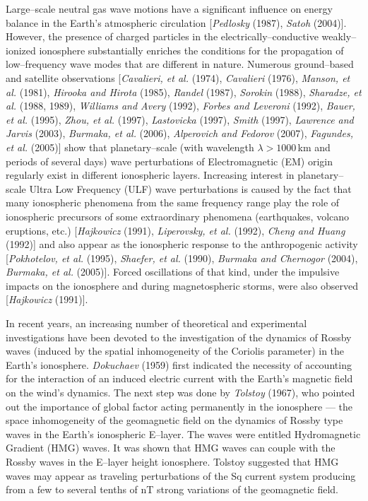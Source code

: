 \documentclass[a4paper,openany,12pt]{book}
\begin{document}
Large--scale neutral gas wave motions have a significant influence on energy balance in the Earth's atmospheric circulation [\emph{Pedlosky} (1987), \emph{Satoh} (2004)]. However, the presence of charged particles in the electrically--conductive weakly--ionized ionosphere substantially enriches the conditions for the propagation of low--frequency wave modes that are different in nature. Numerous ground--based and satellite observations [\emph{Cavalieri, et al.} (1974), \emph{Cavalieri} (1976), \emph{Manson, et al.} (1981), \emph{Hirooka and Hirota} (1985), \emph{Randel} (1987), \emph{Sorokin} (1988), \emph{Sharadze, et al.} (1988, 1989), \emph{Williams and Avery} (1992), \emph{Forbes and Leveroni} (1992), \emph{Bauer, et al.} (1995), \emph{Zhou, et al.} (1997), \emph{Lastovicka} (1997), \emph{Smith} (1997), \emph{Lawrence and Jarvis} (2003), \emph{Burmaka, et al.} (2006), \emph{Alperovich and Fedorov} (2007), \emph{Fagundes, et al.} (2005)] show that planetary--scale (with wavelength $\lambda>1000\,$km and periods of several days) wave perturbations of Electromagnetic (EM) origin regularly exist in different ionospheric layers. Increasing interest in planetary--scale Ultra Low Frequency (ULF) wave perturbations is caused by the fact that many ionospheric phenomena from the same frequency range play the role of ionospheric precursors of some extraordinary phenomena (earthquakes, volcano eruptions, etc.) [\emph{Hajkowicz} (1991), \emph{Liperovsky, et al.} (1992), \emph{Cheng and Huang} (1992)] and also appear as the ionospheric response to the anthropogenic activity [\emph{Pokhotelov, et al.} (1995), \emph{Shaefer, et al.} (1990), \emph{Burmaka and Chernogor} (2004), \emph{Burmaka, et al.} (2005)]. Forced oscillations of that kind, under the impulsive impacts on the ionosphere and during magnetospheric storms, were also observed [\emph{Hajkowicz} (1991)]. 

In recent years, an increasing number of theoretical and experimental investigations have been devoted to the investigation of the dynamics of Rossby waves (induced by the spatial inhomogeneity of the Coriolis parameter) in the Earth's ionosphere. \emph{Dokuchaev} (1959) first indicated the necessity of accounting for the interaction of an induced electric current with the Earth's magnetic field on the wind's dynamics. The next step was done by \emph{Tolstoy} (1967), who pointed out the importance of global factor acting permanently in the ionosphere --- the space inhomogeneity of the geomagnetic field on the dynamics of Rossby type waves in the Earth's ionospheric E--layer. The waves were entitled Hydromagnetic Gradient (HMG) waves. It was shown that HMG waves can couple with the Rossby waves in the E--layer height ionosphere. Tolstoy suggested that HMG waves may appear as traveling perturbations of the Sq current system producing from a few to several tenths of nT strong variations of the geomagnetic field. 
\end{document}
